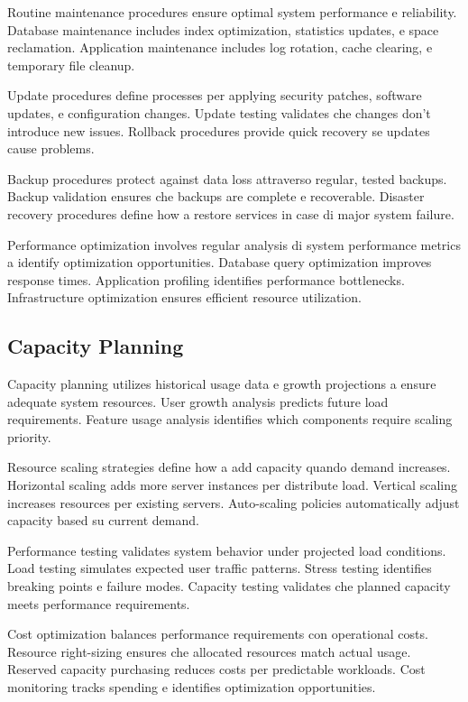 \documentclass[12pt,a4paper]{article}
\begin{document}
Routine maintenance procedures ensure optimal system performance e reliability. Database maintenance includes index optimization, statistics updates, e space reclamation. Application maintenance includes log rotation, cache clearing, e temporary file cleanup.

Update procedures define processes per applying security patches, software updates, e configuration changes. Update testing validates che changes don't introduce new issues. Rollback procedures provide quick recovery se updates cause problems.

Backup procedures protect against data loss attraverso regular, tested backups. Backup validation ensures che backups are complete e recoverable. Disaster recovery procedures define how a restore services in case di major system failure.

Performance optimization involves regular analysis di system performance metrics a identify optimization opportunities. Database query optimization improves response times. Application profiling identifies performance bottlenecks. Infrastructure optimization ensures efficient resource utilization.

\subsection{Capacity Planning}

Capacity planning utilizes historical usage data e growth projections a ensure adequate system resources. User growth analysis predicts future load requirements. Feature usage analysis identifies which components require scaling priority.

Resource scaling strategies define how a add capacity quando demand increases. Horizontal scaling adds more server instances per distribute load. Vertical scaling increases resources per existing servers. Auto-scaling policies automatically adjust capacity based su current demand.

Performance testing validates system behavior under projected load conditions. Load testing simulates expected user traffic patterns. Stress testing identifies breaking points e failure modes. Capacity testing validates che planned capacity meets performance requirements.

Cost optimization balances performance requirements con operational costs. Resource right-sizing ensures che allocated resources match actual usage. Reserved capacity purchasing reduces costs per predictable workloads. Cost monitoring tracks spending e identifies optimization opportunities.
\end{document}
